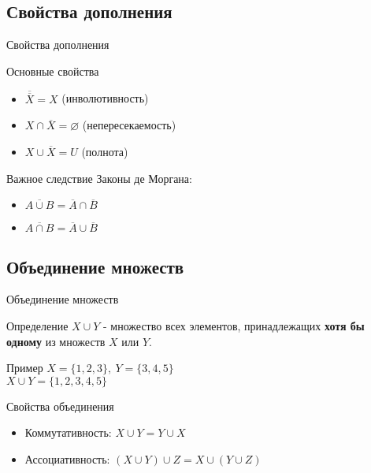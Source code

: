 \documentclass{beamer}
\begin{document}
\subsection{Свойства дополнения}
\begin{frame}{Свойства дополнения}
    \begin{block}{Основные свойства}
    \begin{itemize}
        \item $\overline{\overline{X}} = X$ (инволютивность)
        \item $X \cap \overline{X} = \varnothing$ (непересекаемость)
        \item $X \cup \overline{X} = U$ (полнота)
    \end{itemize}
    \end{block}
    \begin{alertblock}{Важное следствие}
    Законы де Моргана:
    \begin{itemize}
        \item $\overline{A \cup B} = \overline{A} \cap \overline{B}$
        \item $\overline{A \cap B} = \overline{A} \cup \overline{B}$
    \end{itemize}
    \end{alertblock}
\end{frame}

\subsection{Объединение множеств}
\begin{frame}{Объединение множеств}
    \begin{block}{Определение}
        $X \cup Y$ - множество всех элементов, принадлежащих \textbf{хотя бы одному} из множеств $X$ или $Y$.
    \end{block}
    \begin{exampleblock}{Пример}
        $X = \{1,2,3\},\ Y = \{3,4,5\}$ \\
        $X \cup Y = \{1,2,3,4,5\}$
    \end{exampleblock}
    \begin{block}{Свойства объединения}
        \begin{itemize}
            \item Коммутативность: $X \cup Y = Y \cup X$
            \item Ассоциативность: $(X \cup Y) \cup Z = X \cup (Y \cup Z)$
        \end{itemize}
    \end{block}
\end{frame}
\end{document}
